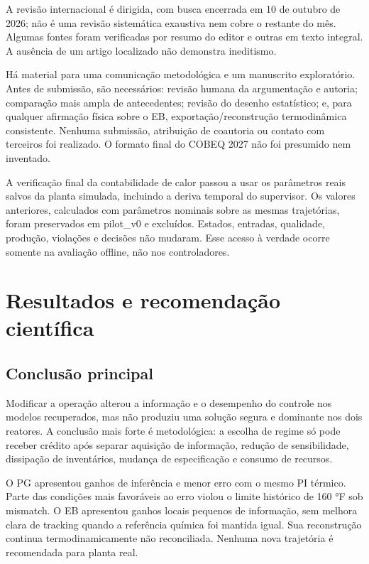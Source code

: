 \documentclass[
  11pt,
  letterpaper,
]{article}
\begin{document}
A revisão internacional é dirigida, com busca encerrada em 10 de outubro
de 2026; não é uma revisão sistemática exaustiva nem cobre o restante do
mês. Algumas fontes foram verificadas por resumo do editor e outras em
texto integral. A ausência de um artigo localizado não demonstra
ineditismo.

Há material para uma comunicação metodológica e um manuscrito
exploratório. Antes de submissão, são necessários: revisão humana da
argumentação e autoria; comparação mais ampla de antecedentes; revisão
do desenho estatístico; e, para qualquer afirmação física sobre o EB,
exportação/reconstrução termodinâmica consistente. Nenhuma submissão,
atribuição de coautoria ou contato com terceiros foi realizado. O
formato final do COBEQ 2027 não foi presumido nem inventado.

A verificação final da contabilidade de calor passou a usar os
parâmetros reais salvos da planta simulada, incluindo a deriva temporal
do supervisor. Os valores anteriores, calculados com parâmetros nominais
sobre as mesmas trajetórias, foram preservados em pilot\_\allowbreak{}v0 e excluídos.
Estados, entradas, qualidade, produção, violações e decisões não
mudaram. Esse acesso à verdade ocorre somente na avaliação offline, não
nos controladores.

\hypertarget{resultados-e-recomendauxe7uxe3o-cientuxedfica}{%
\section{Resultados e recomendação
científica}\label{resultados-e-recomendauxe7uxe3o-cientuxedfica}}

\hypertarget{conclusuxe3o-principal}{%
\subsection{Conclusão principal}\label{conclusuxe3o-principal}}

Modificar a operação alterou a informação e o desempenho do controle nos
modelos recuperados, mas não produziu uma solução segura e dominante nos
dois reatores. A conclusão mais forte é metodológica: a escolha de
regime só pode receber crédito após separar aquisição de informação,
redução de sensibilidade, dissipação de inventários, mudança de
especificação e consumo de recursos.

O PG apresentou ganhos de inferência e menor erro com o mesmo PI
térmico. Parte das condições mais favoráveis ao erro violou o limite
histórico de 160 °F sob mismatch. O EB apresentou ganhos locais pequenos
de informação, sem melhora clara de tracking quando a referência química
foi mantida igual. Sua reconstrução continua termodinamicamente não
reconciliada. Nenhuma nova trajetória é recomendada para planta real.
\end{document}
